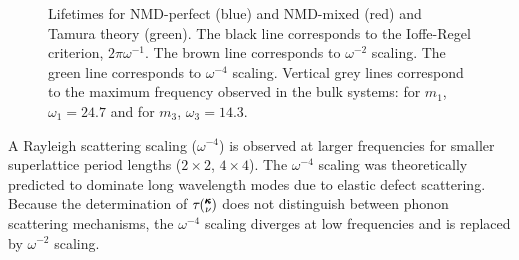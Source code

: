 \documentclass[aps,prb,preprint,preprintnumbers,amsmath,amssymb,floatfix,superscriptaddress]{revtex4}
\newcommand{\kv}{\mspace{-4.0mu}\left(\mspace{-8.0mu}
\begin{smallmatrix}&\pmb{\kappa} \\&\nu\end{smallmatrix}
\mspace{-3.0mu}\right)}
\begin{document}
\renewcommand{\textfraction}{0.0}
\begin{figure}%
\begin{center}
\renewcommand{\figure}{Fig.}
\caption{Lifetimes for NMD-perfect (blue) and NMD-mixed (red) and Tamura theory (green). The black line corresponds to the Ioffe-Regel criterion, $2\pi\omega^{-1}$. The brown line corresponds to $\omega^{-2}$ scaling. The green line corresponds to $\omega^{-4}$ scaling. Vertical grey lines correspond to the maximum frequency observed in the bulk systems: for $m_1$, $\omega_1=24.7$ and for $m_3$, $\omega_3=14.3$. } 
\label{FIG:lifetime}
\end{center}
\end{figure}

A Rayleigh scattering scaling ($\omega^{-4}$) is observed at larger frequencies for smaller superlattice period lengths ($2\times2$, $4\times4$). The $\omega^{-4}$ scaling was theoretically predicted to dominate long wavelength modes due to elastic defect scattering.\cite{PhysRev.140.A1812,klemens_scattering_1955-3, klemens_thermal_1957-2} Because the determination of $\tau\kv$ does not distinguish between phonon scattering mechanisms, the $\omega^{-4}$ scaling diverges at low frequencies and is replaced by $\omega^{-2}$ scaling. 
\end{document}
